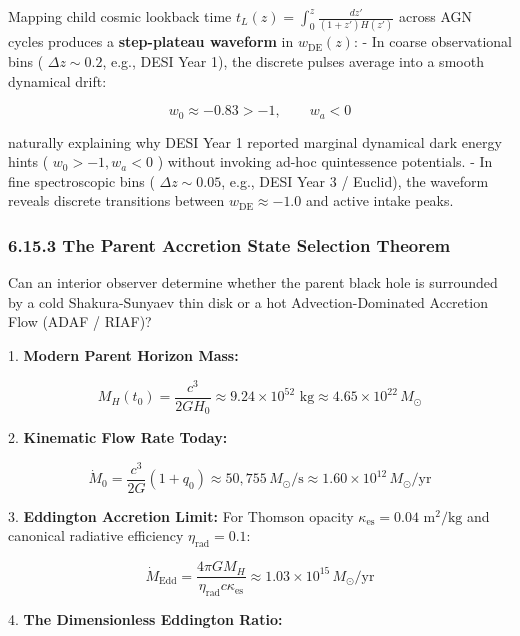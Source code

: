 \documentclass[11pt,a4paper]{article}
\theoremstyle{definition}
\theoremstyle{remark}
\begin{document}
Mapping child cosmic lookback time $t_L(z) = \int_0^z \frac{dz'}{(1+z')H(z')}$ across AGN cycles produces a \textbf{step-plateau waveform} in $w_{\text{DE}}(z)$:
- In coarse observational bins ( $\Delta z \sim 0.2$, e.g., DESI Year 1), the discrete pulses average into a smooth dynamical drift:


\begin{equation}
w_0 \approx -0.83 > -1, \qquad w_a < 0
\end{equation}


naturally explaining why DESI Year 1 reported marginal dynamical dark energy hints ( $w_0 > -1, w_a < 0$ ) without invoking ad-hoc quintessence potentials.
- In fine spectroscopic bins ( $\Delta z \sim 0.05$, e.g., DESI Year 3 / Euclid), the waveform reveals discrete transitions between $w_{\text{DE}} \approx -1.0$ and active intake peaks.

\subsubsection{6.15.3 The Parent Accretion State Selection Theorem}
Can an interior observer determine whether the parent black hole is surrounded by a cold Shakura-Sunyaev thin disk or a hot Advection-Dominated Accretion Flow (ADAF / RIAF)?

1. \textbf{Modern Parent Horizon Mass:}


\begin{equation}
M_H(t_0) = \frac{c^3}{2GH_0} \approx 9.24 \times 10^{52} \text{ kg} \approx 4.65 \times 10^{22} \, M_\odot
\end{equation}


2. \textbf{Kinematic Flow Rate Today:}


\begin{equation}
\dot{M}_0 = \frac{c^3}{2G}(1 + q_0) \approx 50{,}755 \, M_\odot/\text{s} \approx 1.60 \times 10^{12} \, M_\odot/\text{yr}
\end{equation}


3. \textbf{Eddington Accretion Limit:}
For Thomson opacity $\kappa_{\text{es}} = 0.04 \text{ m}^2/\text{kg}$ and canonical radiative efficiency $\eta_{\text{rad}} = 0.1$:


\begin{equation}
\dot{M}_{\text{Edd}} = \frac{4\pi G M_H}{\eta_{\text{rad}} c \kappa_{\text{es}}} \approx 1.03 \times 10^{15} \, M_\odot/\text{yr}
\end{equation}


4. \textbf{The Dimensionless Eddington Ratio:}
\end{document}
